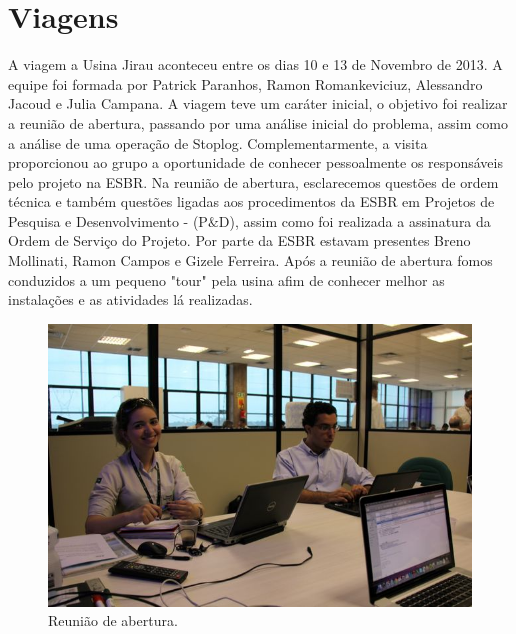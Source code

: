 
\setcounter{secnumdepth}{3}
\section{Viagens}
\label{viagens}

A viagem a Usina Jirau aconteceu entre os dias 10 e 13 de Novembro de 2013. A
equipe foi formada por Patrick Paranhos, Ramon Romankeviciuz, Alessandro Jacoud
e Julia Campana. A viagem teve um caráter inicial, o objetivo foi realizar a
reunião de abertura, passando por  uma análise inicial do problema, assim como a
análise de uma operação de Stoplog. Complementarmente, a visita proporcionou ao
grupo a oportunidade de conhecer pessoalmente os responsáveis pelo projeto na
ESBR.
Na reunião de abertura, esclarecemos questões de ordem técnica e também questões
ligadas aos procedimentos da ESBR em Projetos de Pesquisa e Desenvolvimento -
(P$\&$D), assim como foi realizada a assinatura da Ordem de Serviço do Projeto.  Por parte da ESBR estavam presentes Breno Mollinati, Ramon Campos e
Gizele Ferreira. Após a reunião de abertura fomos conduzidos a um pequeno "tour"
pela usina afim de conhecer melhor as instalações e as atividades lá realizadas.

\begin{figure}[ht!]
    \centering \includegraphics[width=0.6\columnwidth]{figs/jirau/jirau_01}
    \caption{Reunião de abertura.}
    \label{fig:jirau1}
\end{figure}

